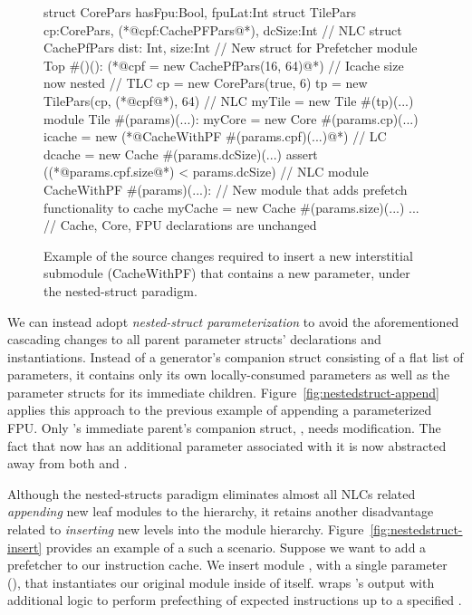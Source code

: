 \begin{figure}
\centering
\begin{phdl}
struct CorePars {hasFpu:Bool, fpuLat:Int}
struct TilePars {cp:CorePars, (*@\textcolor[rgb]{1,0,0}{cpf:CachePFPars}@*), dcSize:Int}      // NLC
struct CachePfPars {dist: Int, size:Int} // New struct for Prefetcher
module Top #()():
  (*@\textcolor[rgb]{1,0,0}{cpf = new CachePfPars(16, 64)}@*)  // Icache size now nested      // TLC
  cp = new CorePars(true, 6)
  tp = new TilePars(cp, (*@\textcolor[rgb]{1,0,0}{cpf}@*), 64)                                // NLC
  myTile = new Tile #(tp)(...)
module Tile #(params)(...):
  myCore = new Core  #(params.cp)(...)
  icache = new (*@\textcolor[rgb]{1,0,0}{CacheWithPF \#(params.cpf)(...)}@*)                   // LC
  dcache = new Cache #(params.dcSize)(...)
  assert ((*@\textcolor[rgb]{1,0,0}{params.cpf.size}@*) < params.dcSize)                      // NLC
module CacheWithPF #(params)(...):  // New module that adds prefetch functionality to cache
  myCache = new Cache #(params.size)(...)
... // Cache, Core, FPU declarations are unchanged
\end{phdl} 
\caption{Example of the source changes required to insert a new interstitial submodule (CacheWithPF) that contains a new parameter,
under the nested-struct paradigm.}
\label{fig::nestedstruct-insert}
\end{figure}

We can instead adopt \emph{nested-struct parameterization} to avoid the aforementioned cascading changes to all parent parameter structs' declarations and instantiations. 
Instead of a generator's companion struct consisting of a flat list of parameters, it contains only its own locally-consumed parameters as well as the parameter structs for its immediate children. 
Figure~\ref{fig:nestedstruct-append} applies this approach to the previous example of appending a parameterized FPU.
Only 's immediate parent's companion struct, , needs modification.
The fact that  now has an additional parameter associated with it is now abstracted away from both  and .

Although the nested-structs paradigm eliminates almost all NLCs related {\em appending} new leaf modules to the hierarchy,
it retains another disadvantage related to {\em inserting} new levels into the module hierarchy.
Figure~\ref{fig:nestedstruct-insert} provides an example of a such a scenario.
Suppose we want to add a prefetcher to our instruction cache. 
We insert module , with a single parameter (), that instantiates our original  module inside of itself.
 wraps 's output with additional logic to perform prefecthing of expected instructions up to a specified .


